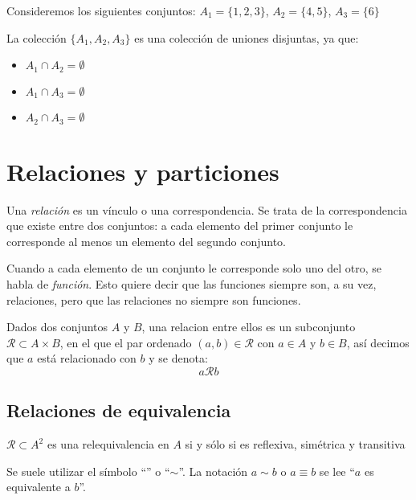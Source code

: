 \begin{fmd-example}
	Consideremos los siguientes conjuntos: \(A_1 = \{1, 2, 3\}\), \(A_2 = \{4, 5\}\), \(A_3 = \{6\}\)
	
	La colección \(\{A_1, A_2, A_3\}\) es una colección de uniones disjuntas, ya que:
	\begin{itemize}[itemsep=0pt]
		\item \(A_1 \cap A_2 = \emptyset\)
		\item \(A_1 \cap A_3 = \emptyset\)
		\item \(A_2 \cap A_3 = \emptyset\)
	\end{itemize}
\end{fmd-example}


\section{Relaciones y particiones}
	Una \textit{relación} es un vínculo o una correspondencia. Se trata de la correspondencia que existe entre dos conjuntos: a cada elemento del primer conjunto le corresponde al menos un elemento del segundo conjunto.
	
	Cuando a cada elemento de un conjunto le corresponde solo uno del otro, se habla de \textit{función}. Esto quiere decir que las funciones siempre son, a su vez, relaciones, pero que las relaciones no siempre son funciones.

\begin{fmd-definition}[Relaciones] 
	Dados dos conjuntos $A$ y $B$, una \gls{relacion} entre ellos es un subconjunto $\mathcal{R} \subset A \times B$, en el que el par ordenado $(a, b) \in \mathcal{R}$ con $a \in A$ y $b \in B$, así decimos que $a$ está relacionado con $b$ y se denota:
	\[ a \mathcal{R} b \]
\end{fmd-definition}

\subsection{Relaciones de equivalencia}
\vspace{3mm} 
\begin{fmd-definition}
	$\mathcal{R} \subset A^2$ es una \gls{relequivalencia} en $A$ si y sólo si es reflexiva, simétrica y transitiva
\end{fmd-definition}

Se suele utilizar el símbolo ``'' o ``$\sim$''. La notación $a \sim b$ o $a \equiv b$ se lee ``$a$ es equivalente a $b$''.


